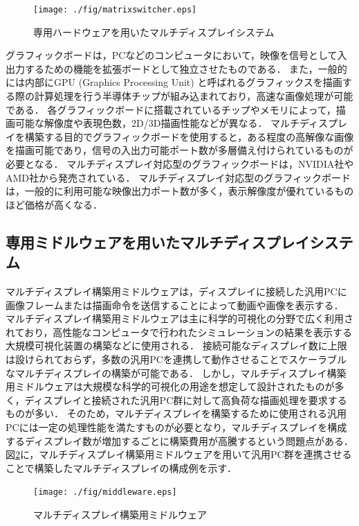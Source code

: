 \begin{figure}[htbp]
 \texttt{[image: ./fig/matrixswitcher.eps]}
 \caption{専用ハードウェアを用いたマルチディスプレイシステム}
 \label{fig_2.1}
\end{figure}

グラフィックボードは，PCなどのコンピュータにおいて，映像を信号として入出力するための機能を拡張ボードとして独立させたものである．
また，一般的には内部にGPU (Graphics Processing Unit) と呼ばれるグラフィックスを描画する際の計算処理を行う半導体チップが組み込まれており，高速な画像処理が可能である．
各グラフィックボードに搭載されているチップやメモリによって，描画可能な解像度や表現色数，2D/3D描画性能などが異なる．
マルチディスプレイを構築する目的でグラフィックボードを使用すると，ある程度の高解像な画像を描画可能であり，信号の入出力可能ポート数が多層備え付けられているものが必要となる．
マルチディスプレイ対応型のグラフィックボードは，NVIDIA社やAMD社から発売されている．
マルチディスプレイ対応型のグラフィックボードは，一般的に利用可能な映像出力ポート数が多く，表示解像度が優れているものほど価格が高くなる．

\subsection*{専用ミドルウェアを用いたマルチディスプレイシステム}

マルチディスプレイ構築用ミドルウェアは，ディスプレイに接続した汎用PCに画像フレームまたは描画命令を送信することによって動画や画像を表示する．
マルチディスプレイ構築用ミドルウェアは主に科学的可視化の分野で広く利用されており，高性能なコンピュータで行われたシミュレーションの結果を表示する大規模可視化装置の構築などに使用される．
接続可能なディスプレイ数に上限は設けられておらず，多数の汎用PCを連携して動作させることでスケーラブルなマルチディスプレイの構築が可能である．
しかし，マルチディスプレイ構築用ミドルウェアは大規模な科学的可視化の用途を想定して設計されたものが多く，ディスプレイと接続された汎用PC群に対して高負荷な描画処理を要求するものが多い．
そのため，マルチディスプレイを構築するために使用される汎用PCには一定の処理性能を満たすものが必要となり，マルチディスプレイを構成するディスプレイ数が増加するごとに構築費用が高騰するという問題点がある．
図\ref{fig_2.2}に，マルチディスプレイ構築用ミドルウェアを用いて汎用PC群を連携させることで構築したマルチディスプレイの構成例を示す．

\begin{figure}[htbp]
 \texttt{[image: ./fig/middleware.eps]}
 \caption{マルチディスプレイ構築用ミドルウェア}
 \label{fig_2.2}
\end{figure}

